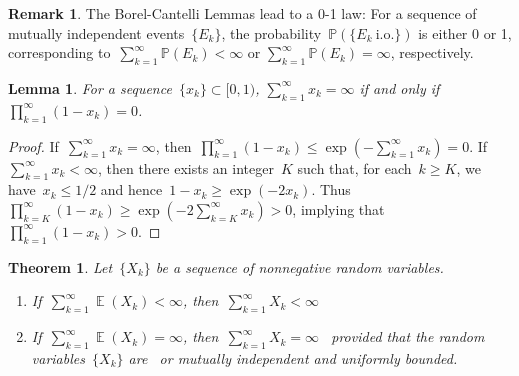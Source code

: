 \documentclass[12pt,a4paper]{article}  %
\newtheorem{theorem}{Theorem}[section]
\newtheorem{lemma}{Lemma}[section]
\theoremstyle{definition}
\newtheorem{remark}{Remark}[section]
\numberwithin{equation}{section}
\newcommand{\io}{{\text{i.o.}}\xspace}
\newcommand{\as}{{\text{a.s.}}\xspace}
\newcommand{\iid}{{\text{i.i.d.}}\xspace}
\DeclareMathOperator{\expc}{\mathbb{E}}
\renewcommand{\Pr}{\mathbb{P}}
\begin{document}
\begin{remark}
    \label{rem:01}
    The Borel-Cantelli Lemmas lead to a 0-1 law: For a sequence of mutually independent
    events~$\{E_k\}$, the probability~$\Pr(\{E_k~\io\})$ is either 0 or 1, corresponding
    to~$\sum_{k=1}^\infty \Pr(E_k) < \infty$ or $\sum_{k=1}^\infty \Pr(E_k) = \infty$, respectively.
\end{remark}

\begin{lemma}
    \label{lem:sumprod}
    For a sequence~$\{x_k\} \subset [0,1)$, $\sum_{k=1}^\infty x_k = \infty$ if and only if
     $\prod_{k=1}^\infty (1-x_k) = 0$.
\end{lemma}
\begin{proof}
    If~$\sum_{k=1}^\infty x_k = \infty$, then~$\prod_{k=1}^\infty (1-x_k)\le \exp(-\sum_{k=1}^\infty
    x_k) = 0$. If~$\sum_{k=1}^\infty x_k < \infty$, then there exists an integer~$K$ such
    that, for each~$k\ge K$, we have~$x_k \le 1/2$ and hence~$1-x_k \ge \exp(-2x_k)$. Thus
    $\prod_{k=K}^\infty (1-x_k) \ge \exp(-2\sum_{k=K}^\infty x_k) > 0$, implying that~$\prod_{k=1}^\infty
    (1-x_k) > 0$.
\end{proof}

\begin{theorem}
    \label{th:inf}
    Let~$\{X_k\}$ be a sequence of nonnegative random variables.
    \begin{enumerate}
        \item If~$\sum_{k=1}^\infty\expc(X_k) < \infty$, then~$\sum_{k=1}^\infty X_k < \infty$~\as
        \item If~$\sum_{k=1}^\infty\expc(X_k)= \infty$, then~$\sum_{k=1}^\infty X_k = \infty$~\as
            provided that the random variables~$\{X_k\}$ are~\iid or mutually independent and
            uniformly bounded.
    \end{enumerate}
\end{theorem}
\end{document}
